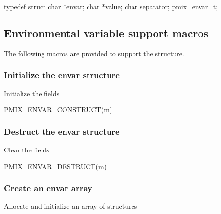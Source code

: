 \cspecificstart
\begin{codepar}
typedef struct {
    char *envar;
    char *value;
    char separator;
} pmix_envar_t;
\end{codepar}
\cspecificend


\subsection{Environmental variable support macros}

The following macros are provided to support the  structure.

\subsubsection{Initialize the envar structure}

Initialize the  fields

\cspecificstart
\begin{codepar}
PMIX_ENVAR_CONSTRUCT(m)
\end{codepar}
\cspecificend

\begin{arglist}
\end{arglist}

\subsubsection{Destruct the envar structure}

Clear the  fields

\cspecificstart
\begin{codepar}
PMIX_ENVAR_DESTRUCT(m)
\end{codepar}
\cspecificend

\begin{arglist}
\end{arglist}


\subsubsection{Create an envar array}

Allocate and initialize an array of  structures

